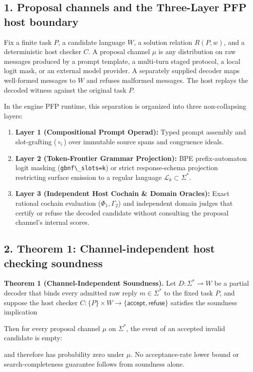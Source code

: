 \documentclass[
  11pt,
]{article}
\newcommand{\passthrough}[1]{#1}
\providecommand{\tightlist}{%
  \setlength{\itemsep}{0pt}\setlength{\parskip}{0pt}}
\newcommand{\PfpDisplayMath}[1]{%
  \sbox{\PfpMathBox}{$\displaystyle #1$}%
  \ifdim\wd\PfpMathBox>\linewidth
    \resizebox{\linewidth}{!}{\usebox{\PfpMathBox}}%
  \else\usebox{\PfpMathBox}\fi}
\begin{document}
\subsection{1. Proposal channels and the Three-Layer PFP host
boundary}\label{proposal-channels-and-the-three-layer-pfp-host-boundary}

Fix a finite task \(P\), a candidate language \(W\), a solution relation
\(R(P,\allowbreak w)\), and a deterministic host checker \(C\). A
proposal channel \(\mu\) is any distribution on raw messages produced by
a prompt template, a multi-turn staged protocol, a local logit mask, or
an external model provider. A separately supplied decoder maps
well-formed messages to \(W\) and refuses malformed messages. The host
replays the decoded witness against the original task \(P\).

In the engine PFP runtime, this separation is organized into three
non-collapsing layers:

\begin{enumerate}
\def\labelenumi{\arabic{enumi}.}
\tightlist
\item
  \textbf{Layer 1 (Compositional Prompt Operad):} Typed prompt assembly
  and slot-grafting (\(\circ_i\)) over immutable source spans and
  congruence ideals.
\item
  \textbf{Layer 2 (Token-Frontier Grammar Projection):} BPE
  prefix-automaton logit masking
  (\passthrough{\lstinline!gbnf\_slots=k!}) or strict response-schema
  projection restricting surface emission to a regular language
  \(\mathcal{L}_k \subset \Sigma^*\).
\item
  \textbf{Layer 3 (Independent Host Cochain \& Domain Oracles):} Exact
  rational cochain evaluation (\(\Phi_1,\allowbreak  \Gamma_2\)) and
  independent domain judges that certify or refuse the decoded candidate
  without consulting the proposal channel's internal scores.
\end{enumerate}

\subsection{2. Theorem 1: Channel-independent host checking
soundness}\label{theorem-1-channel-independent-host-checking-soundness}

\textbf{Theorem 1 (Channel-Independent Soundness).} Let
\(D: \Sigma^* \rightharpoonup W\) be a partial decoder that binds every
admitted raw reply \(m \in \Sigma^*\) to the fixed task \(P\), and
suppose the host checker \(C: \{P\} \times W \to
\{\mathsf{accept},\allowbreak  \mathsf{refuse}\}\) satisfies the
soundness implication
\begin{center}\PfpDisplayMath{C(P, w) = \mathsf{accept} \implies R(P, w).}\end{center}
Then for every proposal channel \(\mu\) on \(\Sigma^*\), the event of an
accepted invalid candidate is empty:
\begin{center}\PfpDisplayMath{\{m \in \Sigma^* : D(m) = w \text{ is defined},\; C(P, w) = \mathsf{accept},\; \neg R(P, w)\} = \emptyset,}\end{center}
and therefore has probability zero under \(\mu\). No acceptance-rate
lower bound or search-completeness guarantee follows from soundness
alone.
\end{document}
